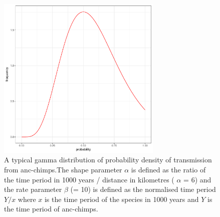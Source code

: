 \documentclass[fleqn,10pt]{wlscirep}
\begin{document}
\begin{figure}[!h]
	\centering
	\includegraphics[width=0.7\textwidth]{figs/gamma-chimp}
	\caption{ A typical gamma distribution of probability density of transmission from anc-chimps.The shape parameter $\alpha$ is defined as the ratio of the time period in 1000 years / distance in kilometres ( $\alpha$ = 6) and the rate parameter $\beta$ (= 10) is defined as the normalised time period $Y / x$ where $x$ is the time period of the species in 1000 years and $Y$ is the time period of anc-chimps.}
	\label{fig:gamma-chimp}   
\end{figure}  
\end{document}
